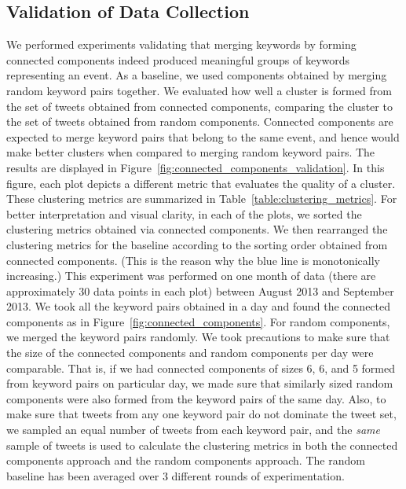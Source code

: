\documentclass[10pt,letterpaper]{article}
\begin{document}
\subsection{Validation of Data Collection}
We performed experiments validating that merging keywords by forming
connected components indeed produced meaningful groups of keywords
representing an event. As a baseline, we used components obtained by
merging random keyword pairs together. We evaluated how well a cluster
is formed from the set of tweets obtained from connected components,
comparing the cluster to the set of tweets obtained from random
components. Connected components are expected to merge
keyword pairs that belong to the same event, and hence would make
better clusters when compared to merging random keyword pairs. The
results are displayed in
Figure~\ref{fig:connected_components_validation}. In this figure, each
plot depicts a different metric that evaluates the quality of a
cluster. These clustering metrics are summarized in
Table~\ref{table:clustering_metrics}. For better interpretation and
visual clarity, in each of the plots, we sorted the clustering metrics
obtained via connected components. We then rearranged the clustering
metrics for the baseline according to the sorting order obtained from
connected components. (This is the reason why the blue line is
monotonically increasing.) This experiment was performed on one month
of data (there are approximately 30 data points in each plot) between
August 2013 and September 2013. We took all the keyword pairs obtained
in a day and found the connected components as in
Figure~\ref{fig:connected_components}. For random components, we
merged the keyword pairs randomly. We took precautions to make sure
that the size of the connected components and random components per
day were comparable. That is, if we had connected components of sizes
6, 6, and 5 formed from keyword pairs on particular day, we made sure
that similarly sized random components were also formed from the
keyword pairs of the same day. Also, to make sure that tweets from any
one keyword pair do not dominate the tweet set, we sampled an equal
number of tweets from each keyword pair, and the \emph{same} sample of
tweets is used to calculate the clustering metrics in both the connected
components approach and the random components approach. The random
baseline has been averaged over 3 different rounds of experimentation.
\end{document}
